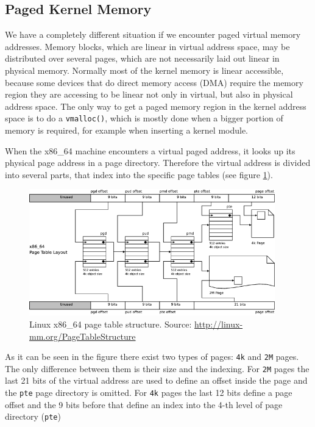 \subsection{Paged Kernel Memory}
\label{paging}
We have a completely different situation if we encounter paged virtual memory addresses.
Memory blocks, which are linear in virtual address space, may be distributed over several pages, which are not necessarily laid out linear in physical memory. Normally most of the kernel memory is linear accessible, because some devices that do direct memory access (DMA) require the memory region they are accessing to be linear not only in virtual, but also in physical address space. The only way to get a paged memory region in the kernel address space is to do a \texttt{vmalloc()}, which is mostly done when a bigger portion of memory is required, for example when inserting a kernel module.

When the x86\_64 machine encounters a virtual paged address, it looks up its physical page address in a page directory. 
Therefore the virtual address is divided into several parts, that index into the specific page tables (see figure \ref{page_table_structure}).

\begin{figure}[htb]
	\includegraphics[width=0.95\textwidth]{imgs/x86_64_pagetable_structure.png}
	\caption{{\small Linux x86\_64 page table structure. Source: \url{http://linux-mm.org/PageTableStructure}}}
	\label{page_table_structure}
\end{figure}

As it can be seen in the figure there exist two types of pages: \texttt{4k} and \texttt{2M} pages. 
The only difference between them is their size and the indexing. For \texttt{2M} pages the last 21 bits 
of the virtual address are used to define an offset inside the page and the \texttt{pte} page directory is omitted. 
For \texttt{4k} pages the last 12 bits define a page offset and the 9 bits before that define an index 
into the 4-th level of page directory (\texttt{pte})

